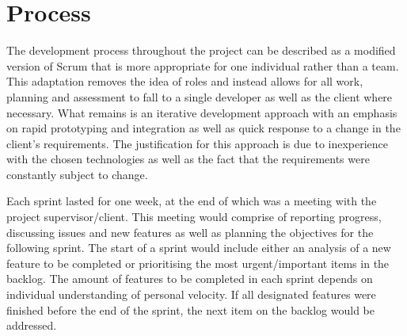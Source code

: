 \section{Process}

The development process throughout the project can be described as a modified version of Scrum that is more appropriate for one individual rather than a team. This adaptation removes the idea of roles and instead allows for all work, planning and assessment to fall to a single developer as well as the client where necessary. What remains is an iterative development approach with an emphasis on rapid prototyping and integration as well as quick response to a change in the client's requirements. The justification for this approach is due to inexperience with the chosen technologies as well as the fact that the requirements were constantly subject to change.
    
Each sprint lasted for one week, at the end of which was a meeting with the project supervisor/client. This meeting would comprise of reporting progress, discussing issues and new features as well as planning the objectives for the following sprint. The start of a sprint would include either an analysis of a new feature to be completed or prioritising the most urgent/important items in the backlog. The amount of features to be completed in each sprint depends on individual understanding of personal velocity. If all designated features were finished before the end of the sprint, the next item on the backlog would be addressed.
